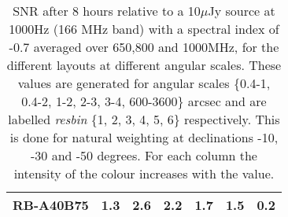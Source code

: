 \begin{table}[!htp]
{{\begin{tabular}{|lcccccc|}
RB-A40B75 & 1.3 \cellcolor{blue!21.38} & 2.6 \cellcolor{red!20.96} & 2.2 \cellcolor{green!21.73} & 1.7 \cellcolor{orange!20.66} & 1.5 \cellcolor{purple!20.67} & 0.2 \cellcolor{blue!18.71}\tabularnewline \hline 
\end{tabular}}\hfill \\
\hfill \\

\caption{SNR after 8 hours relative to a 10$\mu$Jy source at 1000Hz (166 MHz band) with a spectral index of -0.7 averaged over 650,800 and 1000MHz, for the different layouts at different angular scales. These values are generated for angular scales \{0.4-1, 0.4-2, 1-2, 2-3, 3-4, 600-3600\} arcsec and are labelled {\it resbin} \{1, 2, 3, 4, 5, 6\} respectively. This is done for natural weighting at declinations -10, -30 and -50 degrees. For each column the intensity of the colour increases with the value.}\label{tab:snravg-new}}
 \end{table}